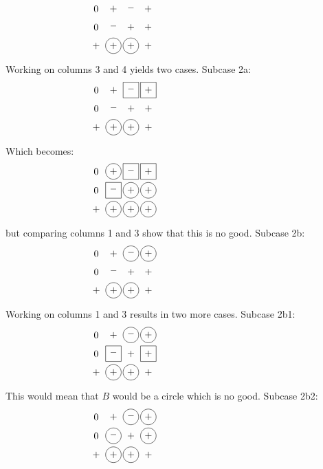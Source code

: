 \begin{equation*}
\myarrset
\begin{array}{cccc}
\ndcz & \ndcp & \ndcm & \ndcp \\
\ndcz & \ndcm & \ndcp & \ndcp \\
\ndcp & \dcp  & \dcp  & \ndcp
\end{array}
~~~~~~~~~~~~~~~~~~~~~~~~~~~~~~~~~~~
\end{equation*}
Working on columns 3 and 4 yields two cases.  Subcase 2a:
\begin{equation*}
\myarrset
\begin{array}{cccc}
\ndcz & \ndcp & \dsm  & \dsp  \\
\ndcz & \ndcm & \ndcp & \ndcp \\
\ndcp & \dcp  & \dcp  & \ndcp
\end{array}
~~~~~~~~~~~~~~~~~~~~~~~~~~~~~~~~~~~
\end{equation*}
Which becomes:
\begin{equation*}
\myarrset
\begin{array}{cccc}
\ndcz & \dcp  & \dsm  & \dsp  \\
\ndcz & \dsm  & \dcp  & \dcp  \\
\ndcp & \dcp  & \dcp  & \dcp
\end{array}
~~~~~~~~~~~~~~~~~~~~~~~~~~~~~~~~~~~
\end{equation*}
but comparing columns 1 and 3 show that this is no good.  Subcase 2b:
\label{refpage25}
\begin{equation*}
\myarrset
\begin{array}{cccc}
\ndcz & \ndcp & \dcm  & \dcp  \\
\ndcz & \ndcm & \ndcp & \ndcp \\
\ndcp & \dcp  & \dcp  & \ndcp
\end{array}
~~~~~~~~~~~~~~~~~~~~~~~~~~~~~~~~~~~
\end{equation*}
Working on columns 1 and 3 results in two more cases.  Subcase 2b1:
\begin{equation*}
\myarrset
\begin{array}{cccc}
\ndcz & \ndcp & \dcm  & \dcp  \\
\ndcz & \dsm  & \ndcp & \dsp  \\
\ndcp & \dcp  & \dcp  & \ndcp
\end{array}
~~~~~~~~~~~~~~~~~~~~~~~~~~~~~~~~~~~
\end{equation*}
This would mean that $B$ would be a circle which is no good.  Subcase 2b2:
\begin{equation*}
\myarrset
\begin{array}{cccc}
\ndcz & \ndcp & \dcm  & \dcp  \\
\ndcz & \dcm  & \ndcp & \dcp  \\
\ndcp & \dcp  & \dcp  & \ndcp
\end{array}
~~~~~~~~~~~~~~~~~~~~~~~~~~~~~~~~~~~
\end{equation*}
